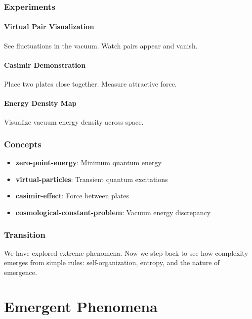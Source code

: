 \documentclass[
  11pt,
  letterpaper,
  twoside,
  openright]{book}
\providecommand{\tightlist}{%
  \setlength{\itemsep}{0pt}\setlength{\parskip}{0pt}}
\begin{document}
\section{Experiments}\label{experiments-36}

\subsection{Virtual Pair
Visualization}\label{virtual-pair-visualization}

See fluctuations in the vacuum. Watch pairs appear and vanish.

\subsection{Casimir Demonstration}\label{casimir-demonstration}

Place two plates close together. Measure attractive force.

\subsection{Energy Density Map}\label{energy-density-map}

Visualize vacuum energy density across space.

\section{Concepts}\label{concepts-35}

\begin{itemize}
\tightlist
\item
  \textbf{zero-point-energy}: Minimum quantum energy
\item
  \textbf{virtual-particles}: Transient quantum excitations
\item
  \textbf{casimir-effect}: Force between plates
\item
  \textbf{cosmological-constant-problem}: Vacuum energy discrepancy
\end{itemize}

\section{Transition}\label{transition-36}

We have explored extreme phenomena. Now we step back to see how
complexity emerges from simple rules: self-organization, entropy, and
the nature of emergence.

\part{Emergent Phenomena}
\end{document}
